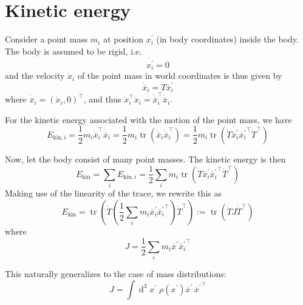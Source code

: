 \documentclass[a4paper]{article}
\begin{document}
\section{Kinetic energy}
Consider a point mass $m_i$ at position $x^\prime_i$ (in body coordinates) inside the body. The body is assumed to be rigid, i.e.
\begin{equation}
\dot{x^\prime_i} = 0
\end{equation}
and the velocity $\dot{x}_i$ of the point mass in world coordinates is thus given by
\begin{equation}
\dot{\overline{x}}_i = \dot{T} \overline{x}^\prime_i
\end{equation}
where $\dot{\overline{x}}_i = (\dot{x}_i, 0)^\top$, and thus $\dot{x}_i^\top \dot{x}_i = \dot{\overline{x}}_i^\top \dot{\overline{x}}_i$.

For the kinetic energy associated with the motion of the point mass, we have
\begin{equation}
E_{\mathrm{kin},i} = \frac{1}{2} m_i \dot{\overline{x}}_i^\top \dot{\overline{x}}_i
= \frac{1}{2} m_i \operatorname{tr} (\dot{\overline{x}}_i \dot{\overline{x}}_i^\top )
= \frac{1}{2} m_i \operatorname{tr} (\dot{T} \overline{x}^\prime_i {\overline{x}^\prime_i}^\top \dot{T}^\top )
\end{equation}

Now, let the body consist of many point masses. The kinetic energy is then
\begin{equation}
E_\mathrm{kin} = \sum_i E_{\mathrm{kin},i}
= \frac{1}{2} \sum_i m_i \operatorname{tr} (\dot{T} \overline{x}^\prime_i {\overline{x}^\prime_i}^\top \dot{T}^\top )
\end{equation}
Making use of the linearity of the trace, we rewrite this as
\begin{equation}
\label{eqn:ekindef}
E_\mathrm{kin} = \operatorname{tr} \left( \dot{T} \left( \frac{1}{2} \sum_i m_i \overline{x}^\prime_i {\overline{x}_i^\prime}^\top \right) \dot{T}^\top \right)
:= \operatorname{tr} (\dot{T} J \dot{T}^\top )
\end{equation}
where
\begin{equation}
J = \frac{1}{2} \sum_i m_i \overline{x}^\prime {\overline{x}_i^\prime}^\top
\end{equation}

This naturally generalizes to the case of mass distributions:
\begin{equation}
J = \int \operatorname{d}^3\!x^\prime\; \rho(x^\prime) \overline{x}^\prime\,{\overline{x}^\prime}^\top
\end{equation}
\end{document}
